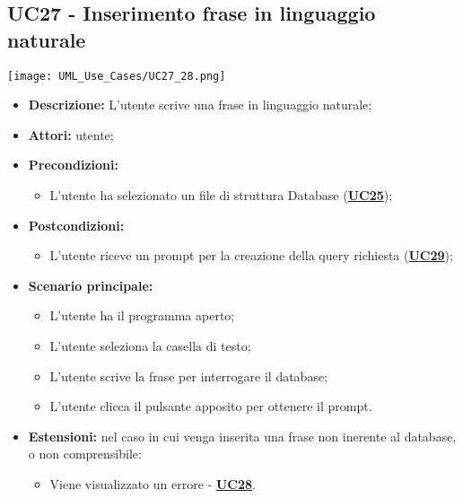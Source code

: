 \subsection{UC27 - Inserimento frase in linguaggio naturale}
\label{sec:UC27}
\texttt{[image: UML\_Use\_Cases/UC27\_28.png]}
\begin{itemize}
	\item \textbf{Descrizione:} L’utente scrive una frase in linguaggio naturale;
	\item \textbf{Attori:} utente;
	\item \textbf{Precondizioni:} 
	\begin{itemize}
		\item L’utente ha selezionato un file di struttura Database (\hyperref[sec:UC25]{\textbf{UC25}});
	\end{itemize}
	\item \textbf{Postcondizioni:} 
	\begin{itemize}
		\item L’utente riceve un prompt per la creazione della query richiesta (\hyperref[sec:UC29]{\textbf{UC29}});
	\end{itemize}
	\item \textbf{Scenario principale:} 
	\begin{itemize}
		\item L’utente ha il programma aperto;
		\item L’utente seleziona la casella di testo;
		\item L’utente scrive la frase per interrogare il database;
		\item L’utente clicca il pulsante apposito per ottenere il prompt.
	\end{itemize}
	\item \textbf{Estensioni:} nel caso in cui venga inserita una frase non inerente al database, o non comprensibile:
	\begin{itemize}
		\item Viene visualizzato un errore - \hyperref[sec:UC28]{\textbf{UC28}}.
	\end{itemize}
\end{itemize}

